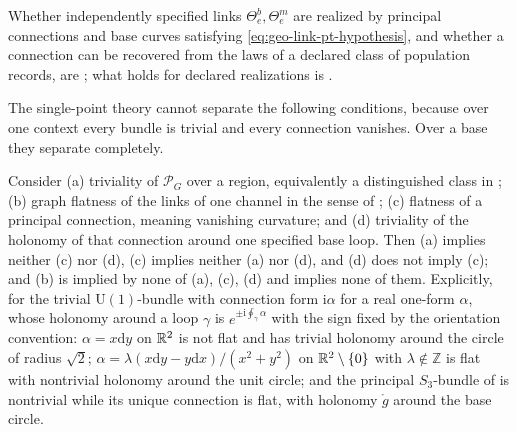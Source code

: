 Whether independently specified links \(\Theta_e^b,\Theta_e^m\) are realized by principal
connections and base curves satisfying \eqref{eq:geo-link-pt-hypothesis}, and whether a connection
can be recovered from the laws of a declared class of population records, are
; what holds for
declared realizations is .

The single-point theory cannot separate the following conditions, because over one context every
bundle is trivial and every connection vanishes. Over a base they separate completely.

Consider (a) triviality of \(\mathscr P_G\) over a region, equivalently a distinguished class in
; (b) graph flatness of the links of one channel in the sense of
; (c) flatness of a principal connection, meaning vanishing
curvature; and (d) triviality of the holonomy of that connection around one specified base loop.
Then (a) implies neither (c) nor (d), (c) implies neither (a) nor (d), and (d) does not imply (c);
and (b) is implied by none of (a), (c), (d) and implies none of them. Explicitly, for the trivial
\(\mathrm U(1)\)-bundle with connection form \(\mathrm i\alpha\) for a real one-form \(\alpha\),
whose holonomy around a loop \(\gamma\) is \(e^{\pm\mathrm i\oint_\gamma\alpha}\) with the sign fixed
by the orientation convention: \(\alpha=x\mathrm dy\) on \(\mathbb R^2\) is not flat and has trivial holonomy
around the circle of radius \(\sqrt2\); \(\alpha=\lambda(x\mathrm dy-y\mathrm dx)/(x^2+y^2)\) on
\(\mathbb R^2\setminus\{0\}\) with \(\lambda\notin\mathbb Z\) is flat with nontrivial holonomy around the
unit circle; and the principal \(S_3\)-bundle of  is
nontrivial while its unique connection is flat, with holonomy \(\mathring g\) around the base circle.

